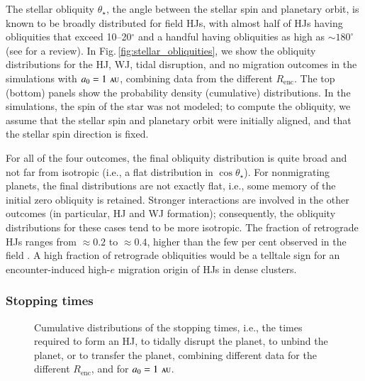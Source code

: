 \documentclass[iop,usenatbib]{emulateapj}
\newcommand{\F}{Fig.}
\newcommand{\au}{\,\textsc{au}}
\newcommand{\renc}{R_\mathrm{enc}}
\begin{document}
The stellar obliquity $\theta_\star$, the angle between the stellar spin and planetary orbit, is known to be broadly distributed for field HJs, with almost half of HJs having obliquities that exceed 10--20$^\circ$ and a handful having obliquities as high as $\sim 180^\circ$ (see \citealt{2015ARA&A..53..409W} for a review). In \F\,\ref{fig:stellar_obliquities}, we show the obliquity distributions for the HJ, WJ, tidal disruption, and no migration outcomes in the simulations with $a_0=1\,\au$, combining data from the different $\renc$. The top (bottom) panels show the probability density (cumulative) distributions. In the simulations, the spin of the star was not modeled; to compute the obliquity, we assume that the stellar spin and planetary orbit were initially aligned, and that the stellar spin direction is fixed. 

For all of the four outcomes, the final obliquity distribution is quite broad and not far from isotropic (i.e., a flat distribution in  $\cos \theta_\star$). For nonmigrating planets, the final distributions are not exactly flat, i.e., some memory of the initial zero obliquity is retained. Stronger interactions are involved in the other outcomes (in particular, HJ and WJ formation); consequently, the obliquity distributions for these cases tend to be more isotropic. The fraction of retrograde HJs ranges from $\approx 0.2$ to $\approx 0.4$, higher than the few per cent observed in the field \citep{2015ARA&A..53..409W}. A high fraction of retrograde obliquities would be a telltale sign for an encounter-induced high-$e$ migration origin of HJs in dense clusters. 


\subsubsection{Stopping times}
\label{sect:pop_syn:times}

\begin{figure}
\center
\iftoggle{ApJFigs}{
\texttt{[image: end\_times\_run05.eps]}
}{
\texttt{[image: figs/end\_times\_run05.eps]}
}
\caption { Cumulative distributions of the stopping times, i.e., the times required to form an HJ, to tidally disrupt the planet, to unbind the planet, or to transfer the planet, combining different data for the different $\renc$, and for $a_0=1\,\au$. }
\label{fig:formation_times}
\end{figure}
\end{document}
